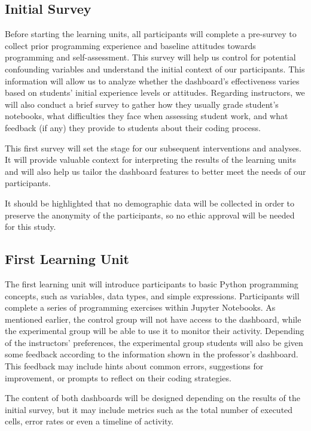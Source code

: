 \subsection{Initial Survey}

Before starting the learning units, all participants will complete a pre-survey to collect prior programming experience and baseline attitudes towards programming and self-assessment. This survey will help us control for potential confounding variables and understand the initial context of our participants. This information will allow us to analyze whether the dashboard's effectiveness varies based on students' initial experience levels or attitudes.
Regarding instructors, we will also conduct a brief survey to gather how they usually grade student's notebooks, what difficulties they face when assessing student work, and what feedback (if any) they provide to students about their coding process.

This first survey will set the stage for our subsequent interventions and analyses. It will provide valuable context for interpreting the results of the learning units and will also help us tailor the dashboard features to better meet the needs of our participants.

It should be highlighted that no demographic data will be collected in order to preserve the anonymity of the participants, so no ethic approval will be needed for this study.

\subsection{First Learning Unit}

The first learning unit will introduce participants to basic Python programming concepts, such as variables, data types, and simple expressions. Participants will complete a series of programming exercises within Jupyter Notebooks. As mentioned earlier, the control group will not have access to the dashboard, while the experimental group will be able to use it to monitor their activity. Depending of the instructors' preferences, the experimental group students will also be given some feedback according to the information shown in the professor's dashboard. This feedback may include hints about common errors, suggestions for improvement, or prompts to reflect on their coding strategies.

The content of both dashboards will be designed depending on the results of the initial survey, but it may include metrics such as the total number of executed cells, error rates or even a timeline of activity.

